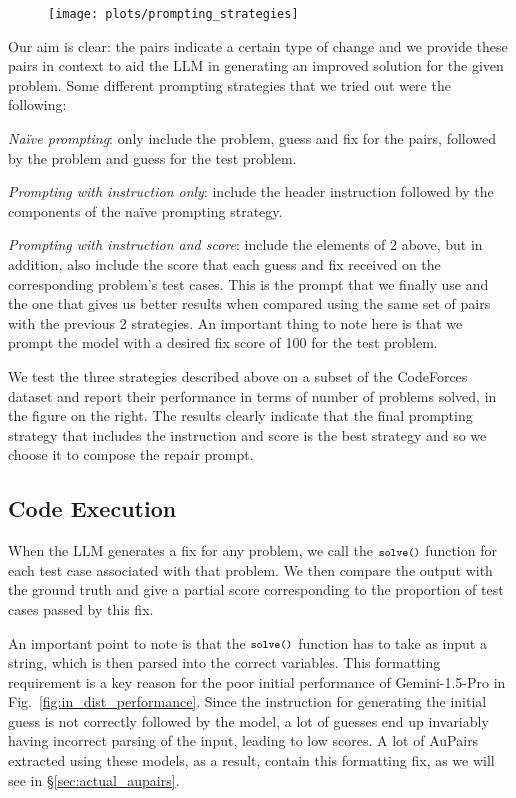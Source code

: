 \documentclass[11pt, a4paper, logo, copyright]{googledeepmind}
\def\aupairs/{\textcolor{golden}{Au}Pairs}
\begin{document}
\begin{wrapfigure}[11]{R}{0.5\linewidth}
    \centering
    \texttt{[image: plots/prompting\_strategies]}
    \label{fig:prompting_strategies}
\end{wrapfigure}

Our aim is clear: the pairs indicate a certain type of change and we provide these pairs in context to aid the LLM in generating an improved solution for the given problem. Some different prompting strategies that we tried out were the following:

\textit{Na\"ive prompting}: only include the problem, guess and fix for the pairs, followed by the problem and guess for the test problem.

\textit{Prompting with instruction only}: include the header instruction followed by the components of the na\"ive prompting strategy.

\textit{Prompting with instruction and score}: include the elements of 2 above, but in addition, also include the score that each guess and fix received on the corresponding problem's test cases. This is the prompt that we finally use and the one that gives us better results when compared using the same set of pairs with the previous 2 strategies. An important thing to note here is that we prompt the model with a desired fix score of 100 for the test problem.

We test the three strategies described above on a subset of the CodeForces dataset and report their performance in terms of number of problems solved, in the figure on the right. The results clearly indicate that the final prompting strategy that includes the instruction and score is the best strategy and so we choose it to compose the repair prompt.

\subsection{Code Execution}\label{sec:code_execution}

When the LLM generates a fix for any problem, we call the $\texttt{\footnotesize solve()}$ function for each test case associated with that problem. We then compare the output with the ground truth and give a partial score corresponding to the proportion of test cases passed by this fix.

An important point to note is that the $\texttt{\footnotesize solve()}$ function has to take as input a string, which is then parsed into the correct variables. This formatting requirement is a key reason for the poor initial performance of Gemini-1.5-Pro in Fig.~\ref{fig:in_dist_performance}. Since the instruction for generating the initial guess is not correctly followed by the model, a lot of guesses end up invariably having incorrect parsing of the input, leading to low scores. A lot of \aupairs/ extracted using these models, as a result, contain this formatting fix, as we will see in \S\ref{sec:actual_aupairs}.
\end{document}
